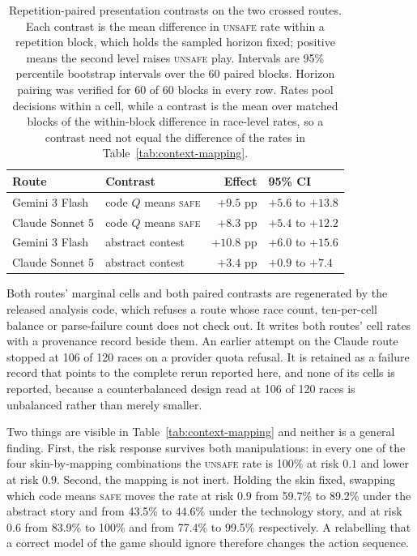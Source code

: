 \documentclass[sigconf,anonymous]{aamas}
\newcommand{\Safe}{\textsc{safe}}
\newcommand{\Unsafe}{\textsc{unsafe}}
\begin{document}
\begin{table}[h]
    \caption{Repetition-paired presentation contrasts on the two crossed
    routes. Each contrast is the mean difference in \Unsafe{} rate within a
    repetition block, which holds the sampled horizon fixed; positive means the
    second level raises \Unsafe{} play. Intervals are 95\% percentile
    bootstrap intervals over the 60 paired blocks. Horizon pairing was verified
    for 60 of 60 blocks in every row. Rates pool decisions within a cell,
    while a contrast is the mean over matched blocks of the within-block
    difference in race-level rates, so a contrast need not equal the
    difference of the rates in Table~\ref{tab:context-mapping}.}
    \label{tab:context-mapping-paired}
    \centering
    \small
    \begin{tabular}{@{}llrl@{}}
        \toprule
        Route & Contrast & Effect & 95\% CI \\
        \midrule
        Gemini 3 Flash   & code $Q$ means \Safe{} & $+9.5$ pp & $+5.6$ to $+13.8$ \\
        Claude Sonnet 5  & code $Q$ means \Safe{} & $+8.3$ pp & $+5.4$ to $+12.2$ \\
        \midrule
        Gemini 3 Flash   & abstract contest        & $+10.8$ pp & $+6.0$ to $+15.6$ \\
        Claude Sonnet 5  & abstract contest        & $+3.4$ pp & $+0.9$ to $+7.4$ \\
        \bottomrule
    \end{tabular}
\end{table}

Both routes' marginal cells and both paired contrasts are regenerated by the
released analysis code, which refuses a route whose race count, ten-per-cell
balance or parse-failure count does not check out. It writes both routes' cell
rates with a provenance record beside them. An earlier attempt on the Claude
route stopped at 106 of 120 races on a provider quota refusal. It is retained
as a failure record that points to the complete rerun reported here, and none
of its cells is reported, because a counterbalanced design read at 106 of 120
races is unbalanced rather than merely smaller.

Two things are visible in Table~\ref{tab:context-mapping} and neither is a
general finding. First, the risk response survives both manipulations: in
every one of the four skin-by-mapping combinations the \Unsafe{} rate is
100\% at risk $0.1$ and lower at risk $0.9$. Second, the mapping is not
inert. Holding the skin fixed, swapping which code means \Safe{} moves the
rate at risk $0.9$ from 59.7\% to 89.2\% under the abstract story and from
43.5\% to 44.6\% under the technology story, and at risk $0.6$ from 83.9\% to
100\% and from 77.4\% to 99.5\% respectively. A relabelling that a correct
model of the game should ignore therefore changes the action sequence.
\end{document}
